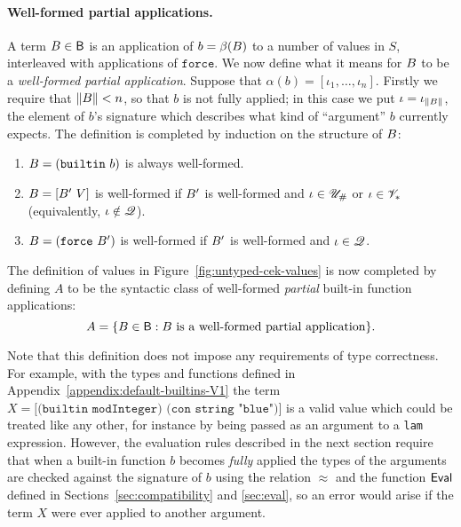 \paragraph{Well-formed partial applications.} A term $B \in \mathsf{B}$ is
an application of $b = \beta(B)$ to a number of values in $S$, interleaved
with applications of $\texttt{force}$.  We now define what it means for $B$
to be a \textit{well-formed partial application}.  Suppose that $\alpha(b) =
[\iota_1, \ldots, \iota_n]$. Firstly we require that $\lVert B \rVert < n$, so
that $b$ is not fully applied; in this case we put
$\iota=\iota_{\lVert B \rVert}$, the element of $b$'s signature which describes
what kind of ``argument'' $b$ currently expects.  The definition is completed by
induction on the structure of $B$:
\begin{enumerate}
\item $B=\mathtt{(builtin}\ b \mathtt{)}$ is always well-formed.
\item $\pba=\mathtt{[}\pba'\ V\mathtt{]}$ is well-formed if $B'$ is
  well-formed and $\iota \in {\mathscr{U}_{\#}}$ or $\iota \in \mathscr{V}_*$ (equivalently, $\iota \notin \mathscr{Q}$).
\item $\pba=\mathtt{(force}\ \pba'\mathtt{)}$ is well-formed if $B'$ is
  well-formed and $\iota \in \mathscr{Q}$.
\end{enumerate}



\medskip
\noindent The definition of values in Figure~\ref{fig:untyped-cek-values} is now
completed by defining $A$ to be the syntactic class of well-formed
\textit{partial} built-in function applications:
$$
A = \{B \in \mathsf{B}: B \text{ is a well-formed partial application} \}.
$$

\noindent Note that this definition does not impose any requirements of type
correctness.  For example, with the types and functions defined in
Appendix~\ref{appendix:default-builtins-V1} the term $X =\texttt{[(builtin
    modInteger) (con string "blue")]}$ is a valid value which could be
treated like any other, for instance by being passed as an argument to a
\texttt{lam} expression.  However, the evaluation rules described in the next
section require that when a built-in function $b$ becomes \textit{fully} applied
the types of the arguments are checked against the signature of $b$ using the
relation $\approx$ and the function $\mathsf{Eval}$ defined in
Sections~\ref{sec:compatibility} and \ref{sec:eval}, so an error would arise if
the term $X$ were ever applied to another argument.
